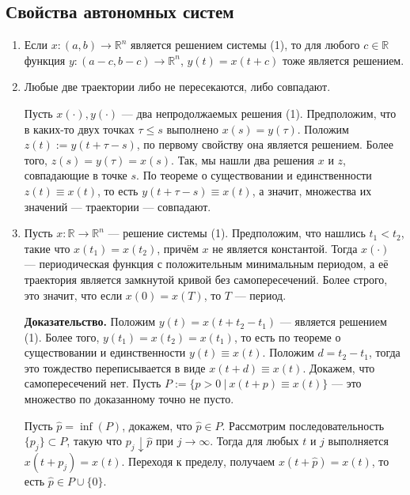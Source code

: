 \subsection{Свойства автономных систем}
\begin{enumerate}
    \item Если $x: (a, b) \to \mathbb R^n$ является решением системы (1), то для любого $c \in \mathbb R$ функция $y: (a - c, b - c) \to \mathbb R^n$, $y(t) = x(t + c)$ тоже является решением.

    \item Любые две траектории либо не пересекаются, либо совпадают.

        Пусть $x(\cdot), y(\cdot)$ --- два непродолжаемых решения (1).
        Предположим, что в каких-то двух точках $\tau \le s$ выполнено $x(s) = y(\tau)$.
        Положим $z(t) := y(t + \tau - s)$, по первому свойству она является решением.
        Более того, $z(s) = y(\tau) = x(s)$.
        Так, мы нашли два решения $x$ и $z$, совпадающие в точке $s$.
        По теореме о существовании и единственности $z(t) \equiv x(t)$, то есть $y(t + \tau - s) \equiv x(t)$, а значит, множества их значений --- траектории --- совпадают.

        \QED

    \item Пусть $x: \mathbb R \to \mathbb R^n$ --- решение системы (1).
        Предположим, что нашлись $t_1 < t_2$, такие что $x(t_1) = x(t_2)$, причём $x$ не является константой.
        Тогда $x(\cdot)$ --- периодическая функция с положительным минимальным периодом, а её траектория является замкнутой кривой без самопересечений.
        Более строго, это значит, что если $x(0) = x(T)$, то $T$ --- период.

        \textbf{Доказательство.} Положим $y(t) = x(t + t_2 - t_1)$ --- является решением (1).
        Более того, $y(t_1) = x(t_2) = x(t_1)$, то есть по теореме о существовании и единственности $y(t) \equiv x(t)$.
        Положим $d = t_2 - t_1$, тогда это тождество переписывается в виде $x(t + d) \equiv x(t)$.
        Докажем, что самопересечений нет.
        Пусть $P := \{p > 0~|~x(t + p) \equiv x(t)\}$ --- это множество по доказанному точно не пусто.

        Пусть $\widehat p = \inf(P)$, докажем, что $\widehat p \in P$.
        Рассмотрим последовательность $\{p_j\} \subset P$, такую что $p_j \downarrow \widehat p$ при $j \to \infty$.
        Тогда для любых $t$ и $j$ выполняется $x(t + p_j) = x(t)$.
        Переходя к пределу, получаем $x(t + \widehat p) = x(t)$, то есть $\widehat p \in P \cup \{0\}$.


\end{enumerate}
